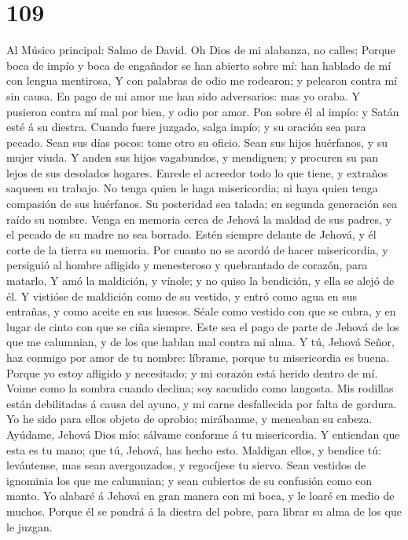 \hypertarget{section-108}{%
\section{109}\label{section-108}}

 Al Músico principal: Salmo de David. Oh Dios de mi
alabanza, no calles;  Porque boca de impío y boca de
engañador se han abierto sobre mí: han hablado de mí con lengua
mentirosa,  Y con palabras de odio me rodearon; y pelearon
contra mí sin causa.  En pago de mi amor me han sido
adversarios: mas yo oraba.  Y pusieron contra mí mal por
bien, y odio por amor.  Pon sobre él al impío: y Satán
esté á su diestra.  Cuando fuere juzgado, salga impío; y
su oración sea para pecado.  Sean sus días pocos: tome
otro su oficio.  Sean sus hijos huérfanos, y su mujer
viuda.  Y anden sus hijos vagabundos, y mendiguen; y
procuren su pan lejos de sus desolados hogares.  Enrede
el acreedor todo lo que tiene, y extraños saqueen su trabajo.
 No tenga quien le haga misericordia; ni haya quien tenga
compasión de sus huérfanos.  Su posteridad sea talada; en
segunda generación sea raído su nombre.  Venga en memoria
cerca de Jehová la maldad de sus padres, y el pecado de su madre no sea
borrado.  Estén siempre delante de Jehová, y él corte de
la tierra su memoria.  Por cuanto no se acordó de hacer
misericordia, y persiguió al hombre afligido y menesteroso y quebrantado
de corazón, para matarlo.  Y amó la maldición, y vínole;
y no quiso la bendición, y ella se alejó de él.  Y
vistióse de maldición como de su vestido, y entró como agua en sus
entrañas, y como aceite en sus huesos.  Séale como
vestido con que se cubra, y en lugar de cinto con que se ciña siempre.
 Este sea el pago de parte de Jehová de los que me
calumnian, y de los que hablan mal contra mi alma.  Y tú,
Jehová Señor, haz conmigo por amor de tu nombre: líbrame, porque tu
misericordia es buena.  Porque yo estoy afligido y
necesitado; y mi corazón está herido dentro de mí.  Voime
como la sombra cuando declina; soy sacudido como langosta.
 Mis rodillas están debilitadas á causa del ayuno, y mi
carne desfallecida por falta de gordura.  Yo he sido para
ellos objeto de oprobio; mirábanme, y meneaban su cabeza.
 Ayúdame, Jehová Dios mío: sálvame conforme á tu
misericordia.  Y entiendan que esta es tu mano; que tú,
Jehová, has hecho esto.  Maldigan ellos, y bendice tú:
levántense, mas sean avergonzados, y regocíjese tu siervo.
 Sean vestidos de ignominia los que me calumnian; y sean
cubiertos de su confusión como con manto.  Yo alabaré á
Jehová en gran manera con mi boca, y le loaré en medio de muchos.
 Porque él se pondrá á la diestra del pobre, para librar
su alma de los que le juzgan.

